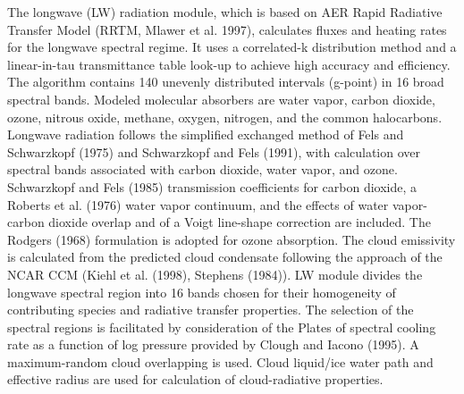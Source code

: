 The longwave (LW) radiation module, which is based on A\+ER Rapid Radiative Transfer Model (R\+R\+TM, Mlawer et al. 1997), calculates fluxes and heating rates for the longwave spectral regime. It uses a correlated-\/k distribution method and a linear-\/in-\/tau transmittance table look-\/up to achieve high accuracy and efficiency. The algorithm contains 140 unevenly distributed intervals (g-\/point) in 16 broad spectral bands. Modeled molecular absorbers are water vapor, carbon dioxide, ozone, nitrous oxide, methane, oxygen, nitrogen, and the common halocarbons. Longwave radiation follows the simplified exchanged method of Fels and Schwarzkopf (1975) and Schwarzkopf and Fels (1991), with calculation over spectral bands associated with carbon dioxide, water vapor, and ozone. Schwarzkopf and Fels (1985) transmission coefficients for carbon dioxide, a Roberts et al. (1976) water vapor continuum, and the effects of water vapor-\/carbon dioxide overlap and of a Voigt line-\/shape correction are included. The Rodgers (1968) formulation is adopted for ozone absorption. The cloud emissivity is calculated from the predicted cloud condensate following the approach of the N\+C\+AR C\+CM (Kiehl et al. (1998), Stephens (1984)). LW module divides the longwave spectral region into 16 bands chosen for their homogeneity of contributing species and radiative transfer properties. The selection of the spectral regions is facilitated by consideration of the Plates of spectral cooling rate as a function of log pressure provided by Clough and Iacono (1995). A maximum-\/random cloud overlapping is used. Cloud liquid/ice water path and effective radius are used for calculation of cloud-\/radiative properties. 